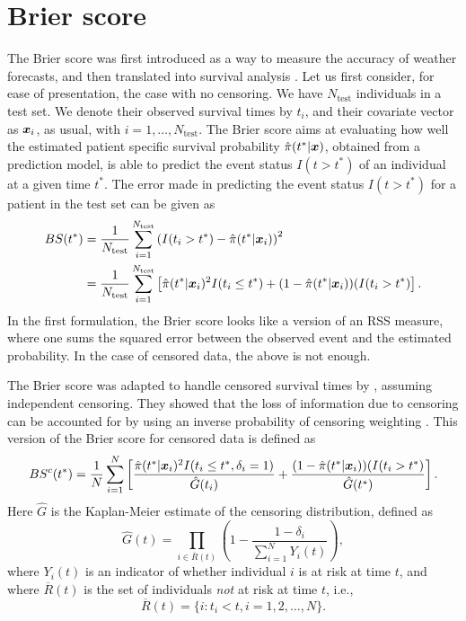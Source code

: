 \section{Brier score}
The Brier score \citep{brier1950} was first introduced as a way to measure the accuracy of weather forecasts, and then translated into survival analysis \citep{graf}.
Let us first consider, for ease of presentation, the case with no censoring.
We have $N_{\text{test}}$ individuals in a test set.
We denote their observed survival times by $t_i$, and their covariate vector as $\bm{x}_i$, as usual, with $i=1,\ldots,N_{\text{test}}$. The Brier score aims at evaluating how well the estimated patient specific survival probability $\hat{\pi}(t^*|\bm{x})$, obtained from a prediction model, is able to predict the event status $I(t>t^*)$ of an individual at a given time $t^*$.
The error made in predicting the event status $I(t>t^*)$ for a patient in the test set can be given as
\begin{align*}
BS(t^*)&=\frac{1}{N_{\text{test}}}\sum_{i=1}^{N_{\text{test}}}\left(I(t_i>t^*)-\hat{\pi}(t^*|\bm{x}_i)\right)^2 \\
    &=\frac{1}{N_{\text{test}}}\sum_{i=1}^{N_{\text{test}}}\left[\hat{\pi}(t^*|\bm{x}_i)^2I(t_i\leq t^*)+(1-\hat{\pi}(t^*|\bm{x}_i))(I(t_i>t^*)\right].
\end{align*}
In the first formulation, the Brier score looks like a version of an RSS measure, where one sums the squared error between the observed event and the estimated probability.
In the case of censored data, the above is not enough.

The Brier score was adapted to handle censored survival times by \citet{graf}, assuming independent censoring.
They showed that the loss of information due to censoring can be accounted for by using an inverse probability of censoring weighting \citep{bovelstadborgan}.
This version of the Brier score for censored data is defined as
\begin{equation*}
    BS^c(t^*)=\frac{1}{N}\sum_{i=1}^N\left[\frac{\hat{\pi}(t^*|\bm{x}_i)^2I(t_i\leq t^*,\delta_i=1)}{\hat{G}(t_i)}+\frac{(1-\hat{\pi}(t^*|\bm{x}_i))(I(t_i>t^*)}{\hat{G}(t^*)}\right].
\end{equation*}
Here $\hat{G}$ is the Kaplan-Meier estimate of the censoring distribution, defined as
\begin{equation*}
    \hat{G}(t)=\prod_{i\in \overline{R}(t)}\left(1-\frac{1-\delta_i}{\sum_{i=1}^NY_i(t)}\right),
\end{equation*}
where $Y_i(t)$ is an indicator of whether individual $i$ is at risk at time $t$, and where $\overline{R}(t)$ is the set of individuals \textit{not} at risk at time $t$, i.e.,
\begin{equation*}
    \overline{R}(t)=\{i\colon t_i<t,i=1,2,\ldots,N\}.
\end{equation*}

